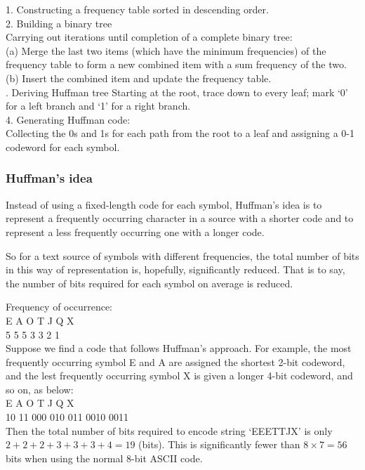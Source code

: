 \documentclass[a4]{beamer}
\begin{document}
\begin{frame}
\large
1. Constructing a frequency table sorted in descending order.\\
2. Building a binary tree\\
Carrying out iterations until completion of a complete binary tree:\\
(a) Merge the last two items (which have the minimum frequencies) of
the frequency table to form a new combined item with a sum
frequency of the two.\\
(b) Insert the combined item and update the frequency table.\\ . Deriving Huffman tree
Starting at the root, trace down to every leaf; mark ‘0’ for a left branch
and ‘1’ for a right branch.\\
4. Generating Huffman code:\\
Collecting the 0s and 1s for each path from the root to a leaf and
assigning a 0-1 codeword for each symbol.
\end{frame}
\begin{frame}
\frametitle{Huffman’s idea}
Instead of using a fixed-length code for each symbol, Huffman’s idea is to
represent a frequently occurring character in a source with a shorter code and
to represent a less frequently occurring one with a longer code. 

So for a text
source of symbols with different frequencies, the total number of bits in this
way of representation is, hopefully, significantly reduced. That is to say, the
number of bits required for each symbol on average is reduced.
\end{frame}
\begin{frame}
Frequency of occurrence:\\
E A O T J Q X\\
5 5 5 3 3 2 1\\
Suppose we find a code that follows Huffman’s approach. For example, the
most frequently occurring symbol E and A are assigned the shortest 2-bit
codeword, and the lest frequently occurring symbol X is given a longer 4-bit
codeword, and so on, as below:\\
E A O T J Q X\\
10 11 000 010 011 0010 0011\\
Then the total number of bits required to encode string `EEETTJX’ is only
$2 + 2 + 2 + 3 + 3 + 3 + 4 = 19$ (bits). This is significantly fewer than
$8 \times 7 = 56$ bits when using the normal 8-bit ASCII code.
\end{frame}
\end{document}
